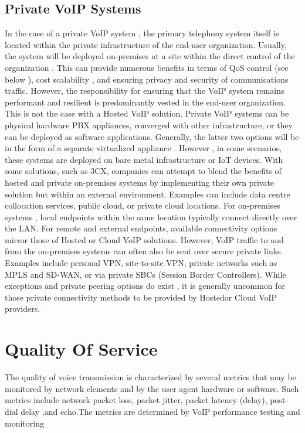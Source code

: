 \subsection{Private VoIP Systems}
In the case of a private VoIP system , the primary telephony system itself is located within the private infrastructure of the end-user organization. Usually, the system will be deployed on-premises at a site within the direct control of the organization . This can provide numerous benefits in terms of QoS control (see below ), cost scalability , and ensuring privacy and security of communications traffic. However, the responsibility for ensuring that the VoIP system remains performant and resilient is predominantly vested in the end-user organization. This is not the case with a Hosted VoIP solution.
Private VoIP systems can be physical hardware PBX appliances, converged with other infrastructure, or they can be deployed as software applications. Generally, the latter two options will be in the form of a separate virtualized appliance . However , in some scenarios, these systems are deployed on bare metal infrastructure or IoT devices. With some solutions, such as 3CX, companies can attempt to blend the benefits of hosted and private on-premises systems by implementing their own private solution but within an external environment. Examples can include data centre collocation services, public cloud, or private cloud locations. For on-premises systems , local endpoints within the same location typically connect directly over the LAN. For remote and external endpoints, available connectivity options mirror those of Hosted or Cloud VoIP solutions. However, VoIP traffic to and from the on-premises systems can often also be sent over secure private links. Examples include personal VPN, site-to-site VPN, private networks such as MPLS and SD-WAN, or via private SBCs (Session Border Controllers). While exceptions and private peering options do exist , it is generally uncommon for those private connectivity methods to be provided by Hostedor Cloud VoIP providers.

\section{Quality Of Service}
\justify \quad
The quality of voice transmission is characterized by several metrics that may be monitored by network elements and by the user agent hardware or software. Such metrics include network packet loss, packet jitter, packet latency (delay), post-dial delay ,and echo.The metrics are determined by VoIP performance testing and monitoring

